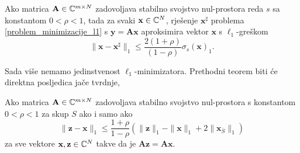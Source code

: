 \documentclass[a4paper,twoside,12pt]{memoir} %
\newcommand{\vect}[1]{\mathbf{#1}}
\renewcommand{\vec}{\vect}
\newcommand{\norm}[1]{\|{#1}\|}
\begin{document}
\begin{thm}\label{stabilnost_tm_1}
    Ako matrica $\vec A \in \C^{m \times N}$ zadovoljava stabilno svojstvo nul-prostora reda $s$ sa konstantom $0<\rho<1$, tada za svaki $\vec x \in \C^N$, rje\v{s}enje $\vec x^{\sharp}$ problema \eqref{problem_minimizacije_l1} s $\vec y = \vec{Ax}$ aproksimira vektor $\vec x$ s $\ell_1$-gre\v{s}kom
    \begin{equation}\label{stabilnost_tm_1_nejed}
        \norm{\vec x - \vec x ^{\sharp}}_1 \leq \frac{2(1+\rho)}{(1-\rho)}\sigma_s(\vec x)_1.
    \end{equation}
\end{thm}
\noindent
Sada vi\v{s}e nemamo jedinstvenost $\ell_1$-minimizatora. Prethodni teorem biti \'ce direktna posljedica ja\v{c}e tvrdnje,
\begin{thm}\label{stabilnost_tm_2}
    Ako matrica $\vec A \in \C^{m \times N}$ zadovoljava stabilno svojstvo nul-prostora s konstantom $0<\rho<1$ za skup $S$ ako i samo ako
    \begin{equation}\label{stabilnost_tm_2_nejed}
        \norm{\vec z - \vec x}_1  \leq \frac{1+\rho}{1-\rho}(\norm{\vec z}_1 - \norm{\vec x}_1 + 2 \norm{\vec x_{\bar S}}_1) 
    \end{equation}
    za sve vektore $\vec x, \vec z \in \C^N$ takve da je $\vec{Az} = \vec{Ax}$.
\end{thm}
\end{document}
